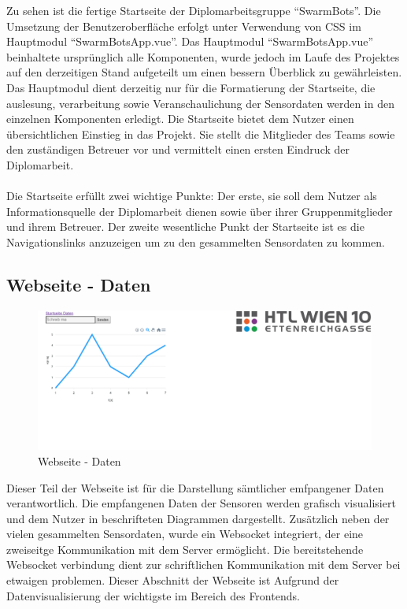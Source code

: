 Zu sehen ist die fertige Startseite der Diplomarbeitsgruppe ``SwarmBots''. 
Die Umsetzung der Benutzeroberfläche erfolgt unter Verwendung von CSS im Hauptmodul ``SwarmBotsApp.vue''.
%
Das Hauptmodul ``SwarmBotsApp.vue'' beinhaltete ursprünglich alle Komponenten, wurde jedoch im Laufe des Projektes
auf den derzeitigen Stand aufgeteilt um einen bessern Überblick zu gewährleisten.
%
Das Hauptmodul dient derzeitig nur für die Formatierung der Startseite, die auslesung, verarbeitung 
sowie Veranschaulichung der Sensordaten werden in den einzelnen Komponenten erledigt. 
%
Die Startseite bietet dem Nutzer einen übersichtlichen Einstieg in das Projekt. Sie stellt die Mitglieder des Teams
sowie den zuständigen Betreuer vor und vermittelt einen ersten Eindruck der Diplomarbeit. \\
% 
\\
Die Startseite erfüllt zwei wichtige Punkte: Der erste, sie soll dem Nutzer als Informationsquelle der 
Diplomarbeit dienen sowie über ihrer Gruppenmitglieder und ihrem Betreuer. 
Der zweite wesentliche Punkt der Startseite ist es die Navigationslinks anzuzeigen um zu den 
gesammelten Sensordaten zu kommen. 

\subsection{Webseite - Daten}
\label{subsubsec:Webseite_Daten}

\begin{figure}[H]
  \includegraphics[width=\textwidth, center]{img/Webseite_Daten.png}
  \caption{Webseite - Daten}
  \label{fig:Webseite_Daten}
\end{figure}

Dieser Teil der Webseite ist für die Darstellung sämtlicher emfpangener Daten verantwortlich.
Die empfangenen Daten der Sensoren werden grafisch visualisiert und dem Nutzer in beschrifteten Diagrammen dargestellt. 
%
Zusätzlich neben der vielen gesammelten Sensordaten, wurde ein Websocket integriert, 
der eine zweiseitge Kommunikation mit dem Server ermöglicht. 
%
Die bereitstehende Websocket verbindung dient zur schriftlichen Kommunikation mit dem Server bei etwaigen problemen.
%
Dieser Abschnitt der Webseite ist Aufgrund der Datenvisualisierung der wichtigste im Bereich des Frontends.

